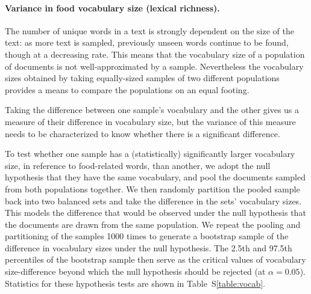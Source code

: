 \documentclass[12pt]{article}
\begin{document}
\paragraph{Variance in food vocabulary size (lexical richness).}
The number of unique words in a text is strongly dependent on the size
of the text: as more text is sampled, previously unseen words continue
to be found, though at a decreasing rate.  
This means that the vocabulary size of a population of documents is 
not well-approximated by a sample.  Nevertheless the vocabulary sizes
obtained by taking equally-sized samples of two different populations
provides a means to compare the populations on an equal footing.

Taking the difference between one sample's vocabulary and the 
other gives us a measure of their difference in vocabulary size, but 
the variance of this measure needs to be characterized to know whether
there is a significant difference.

To test whether one sample has a (statistically) significantly larger
vocabulary size, in reference to food-related words, than another, we adopt 
the null hypothesis that they
have the same vocabulary, and pool the documents sampled from both 
populations together.  We then randomly partition the pooled sample
back into two balanced sets and take the difference in the sets' 
vocabulary sizes.  This models the difference that would be observed
under the null hypothesis that the documents are drawn from the same
population.  We repeat the pooling and partitioning of the samples
1000 times to generate a bootstrap sample of the difference in 
vocabulary sizes under the null hypothesis.  The 
2.5th and 97.5th percentiles of the bootstrap sample then serve as the
critical values of vocabulary size-difference beyond which the null hypothesis
should be rejected (at $\alpha=0.05$).
Statistics for these hypothesis tests are shown in 
Table~S\ref{table:vocab}.
\end{document}
